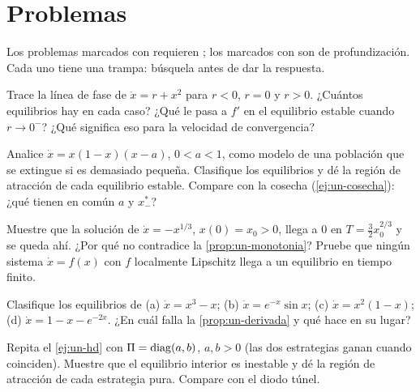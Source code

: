 \section{Problemas}
\label{sec:un-problemas}

Los problemas marcados con \etiquetaM{} requieren \matlab; los marcados con \etiquetaEstrella{} son de profundización. Cada uno tiene una trampa: búsquela antes de dar la respuesta.

\begin{problema}\label{prob:un-sillanodo}
Trace la línea de fase de $\dot x=r+x^2$ para $r<0$, $r=0$ y $r>0$. ¿Cuántos equilibrios hay en cada caso? ¿Qué le pasa a $f'$ en el equilibrio estable cuando $r\to0^-$? ¿Qué significa eso para la velocidad de convergencia?
\end{problema}

\begin{problema}\label{prob:un-allee}
Analice $\dot x=x(1-x)(x-a)$, $0<a<1$, como modelo de una población que se extingue si es demasiado pequeña. Clasifique los equilibrios y dé la región de atracción de cada equilibrio estable. Compare con la cosecha (\cref{ej:un-cosecha}): ¿qué tienen en común $a$ y $x^*_-$?
\end{problema}

\begin{problema}\label{prob:un-finito}
Muestre que la solución de $\dot x=-x^{1/3}$, $x(0)=x_0>0$, llega a $0$ en $T=\tfrac32x_0^{2/3}$ y se queda ahí. ¿Por qué no contradice la \cref{prop:un-monotonia}? Pruebe que ningún sistema $\dot x=f(x)$ con $f$ localmente Lipschitz llega a un equilibrio en tiempo finito.
\end{problema}

\begin{problema}\label{prob:un-clasificar}
Clasifique los equilibrios de (a) $\dot x=x^3-x$; (b) $\dot x=e^{-x}\sin x$; (c) $\dot x=x^2(1-x)$; (d) $\dot x=1-x-e^{-2x}$. ¿En cuál falla la \cref{prop:un-derivada} y qué hace en su lugar?
\end{problema}

\begin{problema}\label{prob:un-coordinacion}
Repita el \cref{ej:un-hd} con $\Pi=\operatorname{diag}(a,b)$, $a,b>0$ (las dos estrategias ganan cuando coinciden). Muestre que el equilibrio interior es inestable y dé la región de atracción de cada estrategia pura. Compare con el diodo túnel.
\end{problema}

